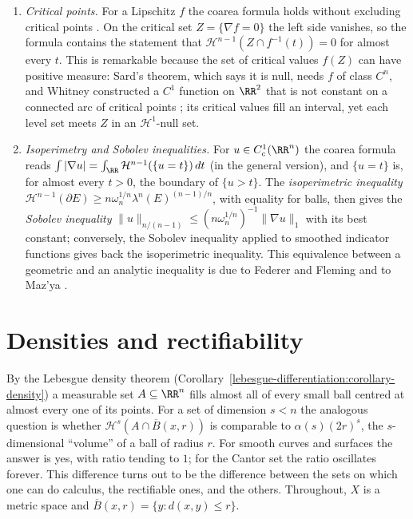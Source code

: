 \begin{remark}\label{geometric-measure-theory:remark-coarea}
\begin{enumerate}
\item \emph{Critical points.} For a Lipschitz $f$ the coarea formula holds without excluding critical points \cite[Section 3.4]{evans-gariepy}. On the critical set $Z = \{\nabla f = 0\}$ the left side
vanishes, so the formula contains the statement that $\mathcal{H}^{n-1}(Z \cap f^{-1}(t)) = 0$ for almost every $t$. This is remarkable because the set of critical values $f(Z)$ can have positive
measure: Sard's theorem, which says it is null, needs $f$ of class $C^n$, and Whitney constructed a $C^1$ function on $\RR^2$ that is not constant on a connected arc of critical points
\cite{whitney-1935}; its critical values fill an interval, yet each level set meets $Z$ in an $\mathcal{H}^1$-null set.
\item \emph{Isoperimetry and Sobolev inequalities.} For $u \in C^1_c(\RR^n)$ the coarea formula reads $\int|\nabla u| = \int_\RR\mathcal{H}^{n-1}(\{u = t\})\,dt$ (in the general version), and
$\{u = t\}$ is, for almost every $t > 0$, the boundary of $\{u > t\}$. The \emph{isoperimetric inequality} $\mathcal{H}^{n-1}(\partial E) \geq n\omega_n^{1/n}\lambda^n(E)^{(n-1)/n}$, with equality for
balls, then gives the \emph{Sobolev inequality} $\|u\|_{n/(n-1)} \leq (n\omega_n^{1/n})^{-1}\|\nabla u\|_1$ with its best constant; conversely, the Sobolev inequality applied to smoothed indicator functions
gives back the isoperimetric inequality. This equivalence between a geometric and an analytic inequality is due to Federer and Fleming and to Maz'ya \cite{federer-fleming-1960}.
\end{enumerate}
\end{remark}

\section{Densities and rectifiability}\label{geometric-measure-theory:section-densities}

By the Lebesgue density theorem (Corollary~\ref{lebesgue-differentiation:corollary-density}) a measurable set $A \subseteq \RR^n$ fills almost all of every small ball centred at almost every one of its
points. For a set of dimension $s < n$ the analogous question is whether $\mathcal{H}^s(A \cap \overline{B}(x, r))$ is comparable to $\alpha(s)(2r)^s$, the $s$-dimensional ``volume'' of a ball of radius
$r$. For smooth curves and surfaces the answer is yes, with ratio tending to $1$; for the Cantor set the ratio oscillates forever. This difference turns out to be the difference between the sets on which
one can do calculus, the rectifiable ones, and the others. Throughout, $X$ is a metric space and $\overline{B}(x, r) = \{y : d(x, y) \leq r\}$.

